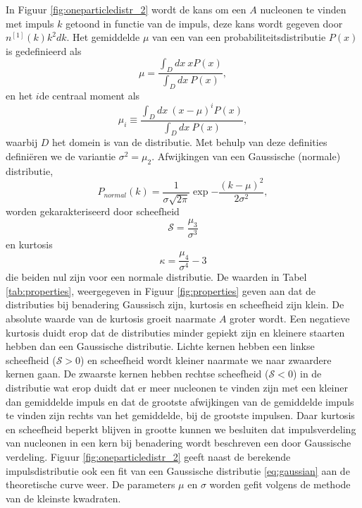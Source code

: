 \documentclass[11pt,twoside]{book}
\begin{document}
In Figuur \ref{fig:oneparticledistr_2} wordt de kans om een $A$ nucleonen te vinden met impuls $k$ getoond in functie van de impuls, deze kans wordt gegeven door $n^{[1]}(k)k^2dk$. 
Het gemiddelde $\mu$ van een van een probabiliteitsdistributie $P(x)$ is gedefinieerd als
\begin{equation}
\mu = \frac{\int_D dx\ xP(x)}{\int_D dx\ P(x)},
\end{equation}
en het $i$de centraal moment als
\begin{equation}
\mu_i \equiv \frac{\int_D dx\ (x-\mu)^i P(x)}{\int_D dx\ P(x)},
\end{equation}
waarbij $D$ het domein is van de distributie. 
Met behulp van deze definities defini\"{e}ren we de variantie $\sigma^2 = \mu_2$. Afwijkingen van een Gaussische (normale) distributie,
\begin{equation} \label{eq:gaussian}
P_{normal}(k)= \frac{1}{\sigma \sqrt{2\pi}} \exp{-\frac{(k-\mu)^2}{2\sigma^2}},
\end{equation}
worden gekarakteriseerd door scheefheid
\begin{equation} \label{eq:skew}
\mathcal{S}  = \frac{\mu_3}{\sigma^3}
\end{equation}
en kurtosis
\begin{equation} \label{eq:kurtosis}
\kappa  = \frac{\mu_4}{\sigma^4} - 3
\end{equation}
die beiden nul zijn voor een normale distributie. De waarden in Tabel \ref{tab:properties}, weergegeven in Figuur \ref{fig:properties} geven aan dat de distributies bij benadering Gaussisch zijn, kurtosis en scheefheid zijn klein. De absolute waarde van de kurtosis groeit naarmate $A$ groter wordt. Een negatieve kurtosis duidt erop dat de distributies minder gepiekt zijn en kleinere staarten hebben dan een Gaussische distributie. Lichte kernen hebben een linkse scheefheid ($\mathcal{S} > 0$) en scheefheid wordt kleiner naarmate we naar zwaardere kernen gaan. De zwaarste kernen hebben rechtse scheefheid ($\mathcal{S} < 0$) in de distributie wat erop duidt dat er meer nucleonen te vinden zijn met een kleiner dan gemiddelde impuls en dat de grootste afwijkingen van de gemiddelde impuls te vinden zijn rechts van het gemiddelde, bij de grootste impulsen. Daar kurtosis en scheefheid beperkt blijven in grootte kunnen we besluiten dat impulsverdeling van nucleonen in een kern bij benadering wordt beschreven een door Gaussische verdeling. Figuur \ref{fig:oneparticledistr_2} geeft naast de berekende impulsdistributie ook een fit van een Gaussische distributie \eqref{eq:gaussian} aan de theoretische curve weer. De parameters $\mu$ en $\sigma$ worden gefit volgens de methode van de kleinste kwadraten.
\end{document}
